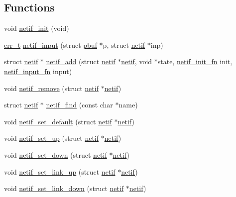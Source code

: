 \subsection*{Functions}
\begin{DoxyCompactItemize}
\item 
void \hyperlink{openmote-cc2538_2lwip_2src_2core_2netif_8c_a0f4a53e47c840904f824a2a1c0d4ebf4}{netif\+\_\+init} (void)
\item 
\hyperlink{group__infrastructure__errors_gaf02d9da80fd66b4f986d2c53d7231ddb}{err\+\_\+t} \hyperlink{group__lwip__nosys_ga5532f93d68c874fb99c681bff2165385}{netif\+\_\+input} (struct \hyperlink{structpbuf}{pbuf} $\ast$p, struct \hyperlink{structnetif}{netif} $\ast$inp)
\item 
struct \hyperlink{structnetif}{netif} $\ast$ \hyperlink{group__netif_gabde72af134ae7047a46ad7719d2a1ee9}{netif\+\_\+add} (struct \hyperlink{structnetif}{netif} $\ast$\hyperlink{structnetif}{netif}, void $\ast$state, \hyperlink{openmote-cc2538_2lwip_2src_2include_2lwip_2netif_8h_a2b02a78a8769925ff8e4f83d34e5e1f5}{netif\+\_\+init\+\_\+fn} init, \hyperlink{openmote-cc2538_2lwip_2src_2include_2lwip_2netif_8h_ab2302b1b64ac7b95f24c6bab754a575e}{netif\+\_\+input\+\_\+fn} input)
\item 
void \hyperlink{group__netif_ga9c6e541f0c184e1ea61a5cd8afe3e979}{netif\+\_\+remove} (struct \hyperlink{structnetif}{netif} $\ast$\hyperlink{structnetif}{netif})
\item 
struct \hyperlink{structnetif}{netif} $\ast$ \hyperlink{group__netif_ga3c82d1c742338828b2f4349a75bb84de}{netif\+\_\+find} (const char $\ast$name)
\item 
void \hyperlink{group__netif_gac90f290edd005238d62aa94c4ac9dea3}{netif\+\_\+set\+\_\+default} (struct \hyperlink{structnetif}{netif} $\ast$\hyperlink{structnetif}{netif})
\item 
void \hyperlink{group__netif_gaf19693be401a265a52d2a56c65753121}{netif\+\_\+set\+\_\+up} (struct \hyperlink{structnetif}{netif} $\ast$\hyperlink{structnetif}{netif})
\item 
void \hyperlink{group__netif_ga641d07ed8c31fe5306bc01605a6790cf}{netif\+\_\+set\+\_\+down} (struct \hyperlink{structnetif}{netif} $\ast$\hyperlink{structnetif}{netif})
\item 
void \hyperlink{group__netif_gae0d2975f189277990e9d5276fdd9e9ea}{netif\+\_\+set\+\_\+link\+\_\+up} (struct \hyperlink{structnetif}{netif} $\ast$\hyperlink{structnetif}{netif})
\item 
void \hyperlink{group__netif_ga34e37a1e8e358760dc1c43887922c7db}{netif\+\_\+set\+\_\+link\+\_\+down} (struct \hyperlink{structnetif}{netif} $\ast$\hyperlink{structnetif}{netif})
\end{DoxyCompactItemize}
